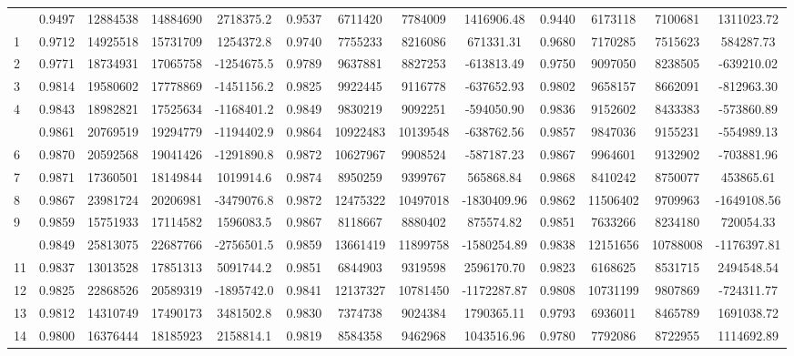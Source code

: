\documentclass[
  12pt,
]{article}
\begin{document}
\begin{longtable}[t]{lcccccccccccc}
\endfoot
\bottomrule
\endlastfoot
0 & 0.9497 & 12884538 & 14884690 & 2718375.2 & 0.9537 & 6711420 & 7784009 & 1416906.48 & 0.9440 & 6173118 & 7100681 & 1311023.72\\
1 & 0.9712 & 14925518 & 15731709 & 1254372.8 & 0.9740 & 7755233 & 8216086 & 671331.31 & 0.9680 & 7170285 & 7515623 & 584287.73\\
2 & 0.9771 & 18734931 & 17065758 & -1254675.5 & 0.9789 & 9637881 & 8827253 & -613813.49 & 0.9750 & 9097050 & 8238505 & -639210.02\\
3 & 0.9814 & 19580602 & 17778869 & -1451156.2 & 0.9825 & 9922445 & 9116778 & -637652.93 & 0.9802 & 9658157 & 8662091 & -812963.30\\
4 & 0.9843 & 18982821 & 17525634 & -1168401.2 & 0.9849 & 9830219 & 9092251 & -594050.90 & 0.9836 & 9152602 & 8433383 & -573860.89\\
\addlinespace
5 & 0.9861 & 20769519 & 19294779 & -1194402.9 & 0.9864 & 10922483 & 10139548 & -638762.56 & 0.9857 & 9847036 & 9155231 & -554989.13\\
6 & 0.9870 & 20592568 & 19041426 & -1291890.8 & 0.9872 & 10627967 & 9908524 & -587187.23 & 0.9867 & 9964601 & 9132902 & -703881.96\\
7 & 0.9871 & 17360501 & 18149844 & 1019914.6 & 0.9874 & 8950259 & 9399767 & 565868.84 & 0.9868 & 8410242 & 8750077 & 453865.61\\
8 & 0.9867 & 23981724 & 20206981 & -3479076.8 & 0.9872 & 12475322 & 10497018 & -1830409.96 & 0.9862 & 11506402 & 9709963 & -1649108.56\\
9 & 0.9859 & 15751933 & 17114582 & 1596083.5 & 0.9867 & 8118667 & 8880402 & 875574.82 & 0.9851 & 7633266 & 8234180 & 720054.33\\
\addlinespace
10 & 0.9849 & 25813075 & 22687766 & -2756501.5 & 0.9859 & 13661419 & 11899758 & -1580254.89 & 0.9838 & 12151656 & 10788008 & -1176397.81\\
11 & 0.9837 & 13013528 & 17851313 & 5091744.2 & 0.9851 & 6844903 & 9319598 & 2596170.70 & 0.9823 & 6168625 & 8531715 & 2494548.54\\
12 & 0.9825 & 22868526 & 20589319 & -1895742.0 & 0.9841 & 12137327 & 10781450 & -1172287.87 & 0.9808 & 10731199 & 9807869 & -724311.77\\
13 & 0.9812 & 14310749 & 17490173 & 3481502.8 & 0.9830 & 7374738 & 9024384 & 1790365.11 & 0.9793 & 6936011 & 8465789 & 1691038.72\\
14 & 0.9800 & 16376444 & 18185923 & 2158814.1 & 0.9819 & 8584358 & 9462968 & 1043516.96 & 0.9780 & 7792086 & 8722955 & 1114692.89\\

\end{longtable}
\end{document}
